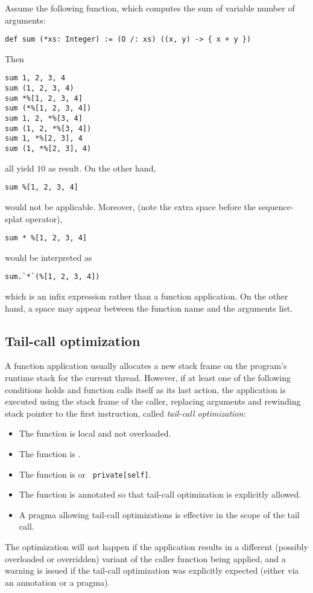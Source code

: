 \example Assume the following function, which computes the sum of variable number of arguments:
\begin{lstlisting}
def sum (*xs: Integer) := (O /: xs) ((x, y) -> { x + y })
\end{lstlisting}
Then 
\begin{lstlisting}
sum 1, 2, 3, 4
sum (1, 2, 3, 4)
sum *%[1, 2, 3, 4]
sum (*%[1, 2, 3, 4])
sum 1, 2, *%[3, 4]
sum (1, 2, *%[3, 4])
sum 1, *%[2, 3], 4
sum (1, *%[2, 3], 4)
\end{lstlisting}
all yield $10$ as result. On the other hand,
\begin{lstlisting}
sum %[1, 2, 3, 4]
\end{lstlisting}
would not be applicable. Moreover, (note the extra space before the sequence-splat operator),
\begin{lstlisting}
sum * %[1, 2, 3, 4]
\end{lstlisting}
would be interpreted as 
\begin{lstlisting}
sum.`*`(%[1, 2, 3, 4])
\end{lstlisting}
which is an infix expression rather than a function application. On the other hand, a space may appear between the function name and the arguments list.





\subsection{Tail-call optimization}

A function application usually allocates a new stack frame on the program's runtime stack for the current thread. However, if at least one of the following conditions holds and function calls itself as its last action, the application is executed using the stack frame of the caller, replacing arguments and rewinding stack pointer to the first instruction, called {\em tail-call optimization}:
\begin{itemize}
\item The function is local and not overloaded. 
\item The function is . 
\item The function is  or ~\lstinline!private[self]!. 
\item The function is annotated so that tail-call optimization is explicitly allowed. 
\item A pragma allowing tail-call optimizations is effective in the scope of the tail call. 
\end{itemize}
The optimization will not happen if the application results in a different (possibly overloaded or overridden) variant of the caller function being applied, and a warning is issued if the tail-call optimization was explicitly expected (either via an annotation or a pragma). 





